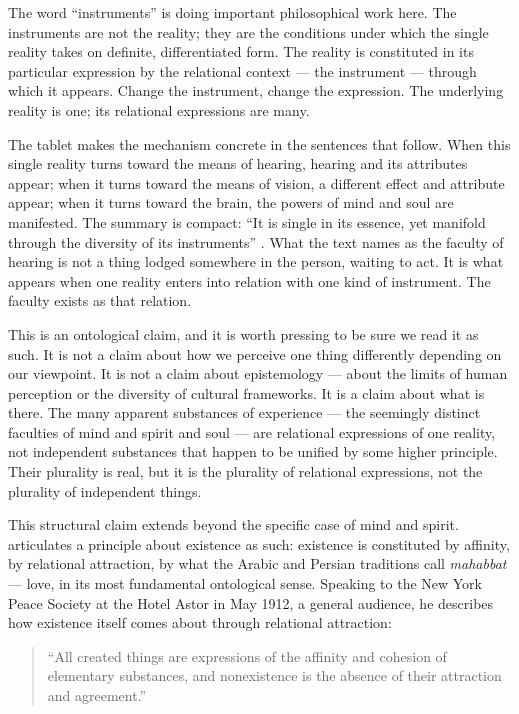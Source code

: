 The word ``instruments'' is doing important philosophical work here. The instruments are not the reality; they are the conditions under which the single reality takes on definite, differentiated form. The reality is constituted in its particular expression by the relational context --- the instrument --- through which it appears. Change the instrument, change the expression. The underlying reality is one; its relational expressions are many.

The tablet makes the mechanism concrete in the sentences that follow. When this single reality turns toward the means of hearing, hearing and its attributes appear; when it turns toward the means of vision, a different effect and attribute appear; when it turns toward the brain, the powers of mind and soul are manifested. The summary is compact: ``It is single in its essence, yet manifold through the diversity of its instruments'' \citep[para.~35]{SummonsLordHosts}. What the text names as the faculty of hearing is not a thing lodged somewhere in the person, waiting to act. It is what appears when one reality enters into relation with one kind of instrument. The faculty exists as that relation.

This is an ontological claim, and it is worth pressing to be sure we read it as such. It is not a claim about how we perceive one thing differently depending on our viewpoint. It is not a claim about epistemology --- about the limits of human perception or the diversity of cultural frameworks. It is a claim about what is there. The many apparent substances of experience --- the seemingly distinct faculties of mind and spirit and soul --- are relational expressions of one reality, not independent substances that happen to be unified by some higher principle. Their plurality is real, but it is the plurality of relational expressions, not the plurality of independent things.

This structural claim extends beyond the specific case of mind and spirit. \AbdulBaha articulates a principle about existence as such: existence is constituted by affinity, by relational attraction, by what the Arabic and Persian traditions call \emph{mahabbat} --- love, in its most fundamental ontological sense. Speaking to the New York Peace Society at the Hotel Astor in May 1912, a general audience, he describes how existence itself comes about through relational attraction:

\begin{quote}
``All created things are expressions of the affinity and cohesion of elementary substances, and nonexistence is the absence of their attraction and agreement.''
\citep[Talk 48]{PUP}
\end{quote}

